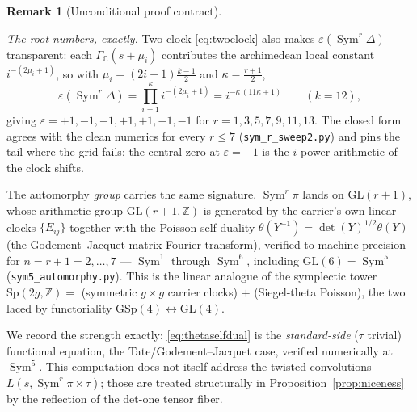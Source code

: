 \documentclass[11pt]{article}
\theoremstyle{definition}
\newtheorem{remark}[theorem]{Remark}
\newcommand{\Sym}{\operatorname{Sym}}
\begin{document}
\begin{remark}[Unconditional proof contract]
\begin{enumerate}
\emph{The root numbers, exactly.} Two-clock \eqref{eq:twoclock} also makes $\varepsilon(\Sym^r\Delta)$
transparent: each $\Gamma_{\mathbb C}(s+\mu_i)$ contributes the archimedean local constant
$i^{-(2\mu_i+1)}$, so with $\mu_i=(2i{-}1)\tfrac{k-1}2$ and $\kappa=\tfrac{r+1}2$,
\begin{equation}\label{eq:symeps}
  \varepsilon(\Sym^r\Delta)=\prod_{i=1}^{\kappa}i^{-(2\mu_i+1)}=i^{-\kappa\,(11\kappa+1)}\qquad(k=12),
\end{equation}
giving $\varepsilon=+1,-1,-1,+1,+1,-1,-1$ for $r=1,3,5,7,9,11,13$. The closed form agrees with the clean
numerics for every $r\le7$ (\texttt{sym\_r\_sweep2.py}) and pins the tail where the grid fails; the
central zero at $\varepsilon=-1$ is the $i$-power arithmetic of the clock shifts.

The automorphy \emph{group} carries the same signature. $\Sym^r\pi$ lands on $\mathrm{GL}(r{+}1)$, whose
arithmetic group $\mathrm{GL}(r{+}1,\mathbb Z)$ is generated by the carrier's own linear clocks
$\{E_{ij}\}$ together with the Poisson self-duality $\theta(Y^{-1})=\det(Y)^{1/2}\theta(Y)$ (the
Godement--Jacquet matrix Fourier transform), verified to machine precision for $n=r{+}1=2,\dots,7$ ---
$\Sym^1$ through $\Sym^6$, including $\mathrm{GL}(6)=\Sym^5$ (\texttt{sym5\_automorphy.py}). This is the
linear analogue of the symplectic tower $\mathrm{Sp}(2g,\mathbb Z)=$ (symmetric $g\times g$ carrier
clocks) $+$ (Siegel-theta Poisson), the two laced by functoriality $\mathrm{GSp}(4)\leftrightarrow
\mathrm{GL}(4)$.

We record the strength exactly: \eqref{eq:thetaselfdual} is the \emph{standard-side} ($\tau$ trivial)
functional equation, the Tate/Godement--Jacquet case, verified numerically at $\Sym^5$. This computation
does not itself address the twisted convolutions $L(s,\Sym^r\pi\times\tau)$; those are treated
structurally in Proposition~\ref{prop:niceness} by the reflection of the det-one tensor fiber.


\end{enumerate}
\end{remark}
\end{document}
